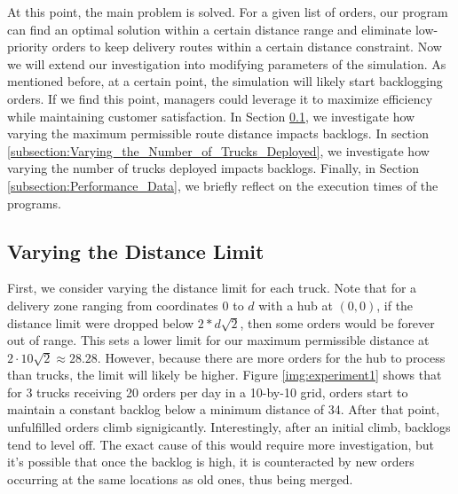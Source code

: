 \documentclass[letterpaper]{article}
\begin{document}
    At this point, the main problem is solved. For a given list of orders, our program can find an optimal solution within a certain distance range and eliminate low-priority orders to keep delivery routes within a certain distance constraint. Now we will extend our investigation into modifying parameters of the simulation. As mentioned before, at a certain point, the simulation will likely start backlogging orders. If we find this point, managers could leverage it to maximize efficiency while maintaining customer satisfaction. In Section \ref{subsection:Varying_the_Distance_Limit}, we investigate how varying the maximum permissible route distance impacts backlogs. In section \ref{subsection:Varying_the_Number_of_Trucks_Deployed}, we investigate how varying the number of trucks deployed impacts backlogs. Finally, in Section \ref{subsection:Performance_Data}, we briefly reflect on the execution times of the programs.

    \subsection{Varying the Distance Limit}
    \label{subsection:Varying_the_Distance_Limit}
    First, we consider varying the distance limit for each truck. Note that for a delivery zone ranging from coordinates 0 to $d$ with a hub at $(0, 0)$, if the distance limit were dropped below $2 * d \sqrt{2}$, then some orders would be forever out of range. This sets a lower limit for our maximum permissible distance at $2 \cdot 10 \sqrt{2} \approx 28.28$. However, because there are more orders for the hub to process than trucks, the limit will likely be higher. Figure \ref{img:experiment1} shows that for 3 trucks receiving 20 orders per day in a 10-by-10 grid, orders start to maintain a constant backlog below a minimum distance of 34. After that point, unfulfilled orders climb signigicantly. Interestingly, after an initial climb, backlogs tend to level off. The exact cause of this would require more investigation, but it's possible that once the backlog is high, it is counteracted by new orders occurring at the same locations as old ones, thus being merged.
\end{document}
